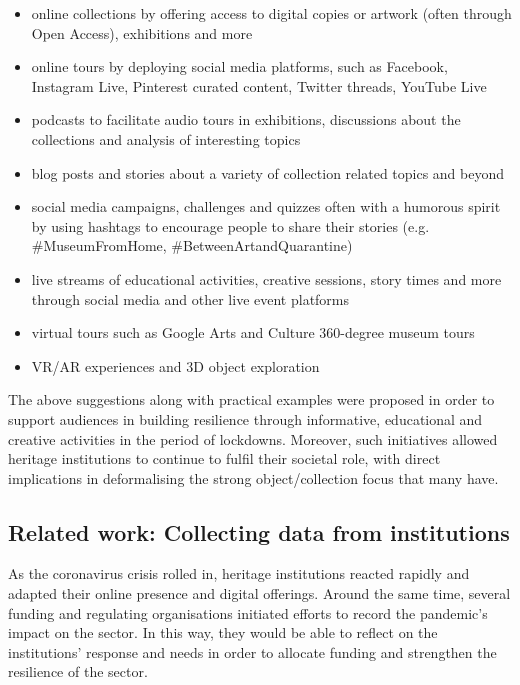 \documentclass{egpubl}
\begin{document}
\begin{itemize}
\item online collections by offering access to digital copies or artwork (often through Open Access), exhibitions and more
  
\item online tours by deploying social media platforms, such as Facebook, Instagram Live, Pinterest curated content, Twitter threads, YouTube Live

\item podcasts to facilitate audio tours in exhibitions, discussions about the collections and analysis of interesting topics

\item blog posts and stories about a variety of collection related topics and beyond

\item social media campaigns, challenges and quizzes often with a humorous spirit by using hashtags to encourage people to share their stories (e.g. \#MuseumFromHome, \#BetweenArtandQuarantine)

\item live streams of educational activities, creative sessions, story times and more through social media and other live event platforms

\item virtual tours such as Google Arts and Culture 360-degree museum tours

\item VR/AR experiences and 3D object exploration

\end{itemize}

The above suggestions along with practical examples were proposed in order to support audiences in building resilience through informative, educational and creative activities in the period of lockdowns. Moreover, such initiatives allowed heritage institutions to continue to fulfil their societal role, with direct implications in deformalising the strong object/collection focus that many have.


\subsection{Related work: Collecting data from institutions}
\label{rel}
As the coronavirus crisis rolled in, heritage institutions reacted rapidly and adapted their online presence and digital offerings. Around the same time, several funding and regulating organisations initiated efforts to record the pandemic's impact on the sector. In this way, they would be able to reflect on the institutions' response and needs in order to allocate funding and strengthen the resilience of the sector.
\end{document}
